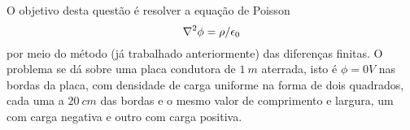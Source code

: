 



  O objetivo desta questão é resolver a equação de Poisson
  \begin{equation*}
    \laplacian{\phi} = \rho / \epsilon_0
  \end{equation*}
  por meio do método (já trabalhado anteriormente) das diferenças finitas. O problema se dá sobre uma placa condutora de $1 \ m$ aterrada, isto é $\phi = 0 V$ nas bordas da placa, com densidade de carga uniforme na forma de dois quadrados, cada uma a $20 \ cm$ das bordas e o mesmo valor de comprimento e largura, um com carga negativa e outro com carga positiva.







